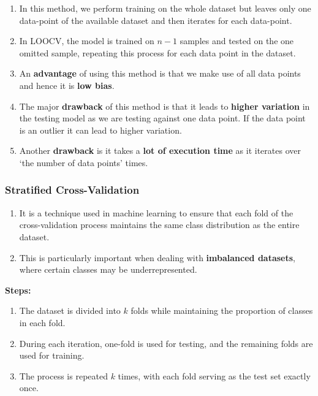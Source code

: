 \begin{enumerate}
    \item In this method, we perform training on the whole dataset but leaves only one data-point of the available dataset and then iterates for each data-point. 
    
    \item In LOOCV, the model is trained on $n-1$ samples and tested on the one omitted sample, repeating this process for each data point in the dataset.

    \item An \textbf{advantage} of using this method is that we make use of all data points and hence it is \textbf{low bias}.

    \item The major \textbf{drawback} of this method is that it leads to \textbf{higher variation} in the testing model as we are testing against one data point. If the data point is an outlier it can lead to higher variation. 
    
    \item Another \textbf{drawback} is it takes a \textbf{lot of execution time} as it iterates over ‘the number of data points’ times.
\end{enumerate}


\subsubsection{Stratified Cross-Validation \cite{geeksforgeeks/cross-validation-machine-learning/}} \label{Cross-Validation: Stratified Cross-Validation}

\begin{enumerate}
    \item It is a technique used in machine learning to ensure that each fold of the cross-validation process maintains the same class distribution as the entire dataset. 
    
    \item This is particularly important when dealing with \textbf{imbalanced datasets}, where certain classes may be underrepresented.

\end{enumerate}

\noindent
\textbf{Steps:}
\begin{enumerate}
    \item The dataset is divided into $k$ folds while maintaining the proportion of classes in each fold.
    
    \item During each iteration, one-fold is used for testing, and the remaining folds are used for training.

    \item The process is repeated $k$ times, with each fold serving as the test set exactly once.

\end{enumerate}



